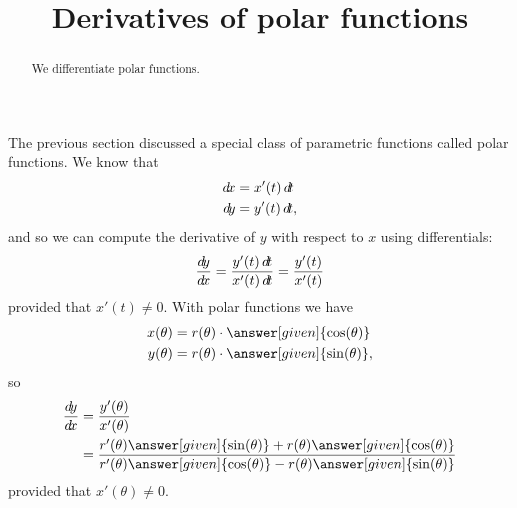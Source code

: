 \documentclass{ximera}
\title[Dig-In:]{Derivatives of polar functions}
\begin{document}
\begin{abstract}
  We differentiate polar functions.
\end{abstract}
\maketitle

The previous section discussed a special class of parametric functions
called polar functions.  We know that
\begin{align*}
  \d x &= x'(t) \d t\\
  \d y &= y'(t) \d t,
\end{align*}
and so we can compute the derivative of $y$ with respect to $x$ using
differentials:
\[
\frac{\d y}{\d x} = \frac{y'(t) \d t}{x'(t) \d t} = \frac{y'(t)}{x'(t)}
\]
provided that $x'(t) \ne 0$.  With polar functions we have
\begin{align*}
  x(\theta) &= r(\theta) \cdot \answer[given]{\cos(\theta)} \\
  y(\theta) &= r(\theta) \cdot \answer[given]{\sin(\theta)},
\end{align*}
so
\begin{align*}
\dd[y]{x} &= \frac{y'(\theta)}{x'(\theta)} \\
&= \frac{r'(\theta) \answer[given]{\sin(\theta)}+r(\theta) \answer[given]{\cos(\theta)}}{r'(\theta) \answer[given]{\cos(\theta)}-r(\theta)\answer[given]{\sin(\theta)}}
\end{align*}
provided that $x'(\theta)\ne 0$.
\end{document}
